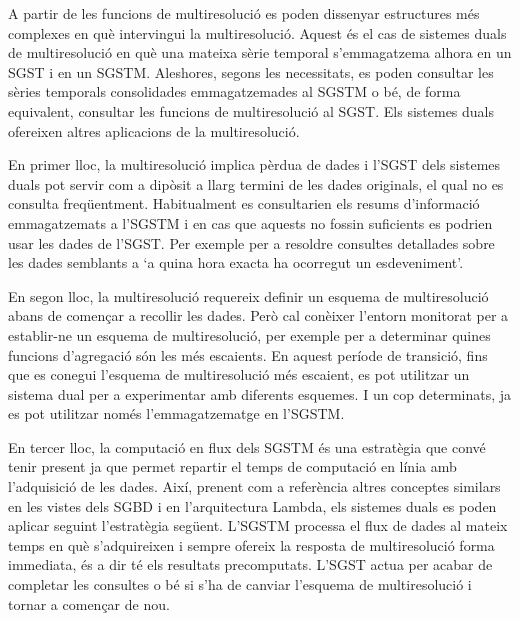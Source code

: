 A partir de les funcions de multiresolució es poden dissenyar
estructures més complexes en què intervingui la multiresolució. Aquest
és el cas de sistemes duals de multiresolució en què una mateixa sèrie
temporal s'emmagatzema alhora en un \gls{SGST} i en un
\gls{SGSTM}. Aleshores, segons les necessitats, es poden consultar les
sèries temporals consolidades emmagatzemades al \gls{SGSTM} o bé, de
forma equivalent, consultar les funcions de multiresolució al
\gls{SGST}.  
Els sistemes duals ofereixen altres aplicacions de la
multiresolució.

En primer lloc, la multiresolució implica pèrdua de dades i
l'\gls{SGST} dels sistemes duals pot servir com a dipòsit a llarg
termini de les dades originals, el qual no es consulta
freqüentment. Habitualment es consultarien els resums d'informació
emmagatzemats a l'\gls{SGSTM} i en cas que aquests no fossin
suficients es podrien usar les dades de l'\gls{SGST}. Per exemple per
a resoldre consultes detallades sobre les dades semblants a `a quina
hora exacta ha ocorregut un esdeveniment'.

En segon lloc, la multiresolució requereix definir un esquema de
multiresolució abans de començar a recollir les dades.  Però cal
conèixer l'entorn monitorat per a establir-ne un esquema de
multiresolució, per exemple per a determinar quines funcions
d'agregació són les més escaients.  En aquest període de transició,
fins que es conegui l'esquema de multiresolució més escaient, es pot
utilitzar un sistema dual per a experimentar amb diferents esquemes. I
un cop determinats, ja es pot utilitzar només l'emmagatzematge en
l'\gls{SGSTM}.

En tercer lloc, la computació en flux dels \gls{SGSTM} és una
estratègia que convé tenir present ja que permet repartir el temps de
computació en línia amb l'adquisició de les dades.  Així, prenent com
a referència altres conceptes similars en les vistes dels \gls{SGBD} i
en l'arquitectura Lambda, els sistemes duals es poden aplicar seguint
l'estratègia següent. L'\gls{SGSTM} processa el flux de dades al
mateix temps en què s'adquireixen i sempre ofereix la resposta de
multiresolució forma immediata, és a dir té els resultats
precomputats. L'\gls{SGST} actua per acabar de completar les consultes
o bé si s'ha de canviar l'esquema de multiresolució i tornar a
començar de nou.



